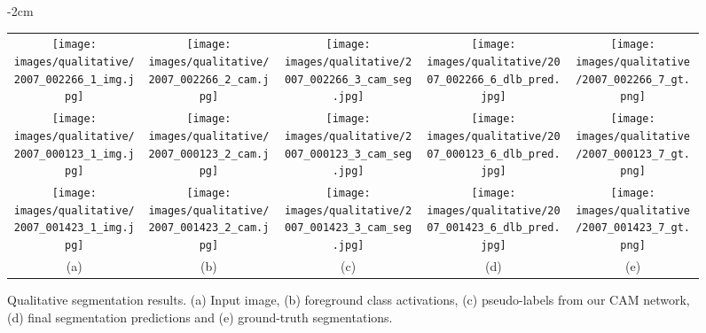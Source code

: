 \documentclass{article}
\begin{document}
\begin{figure}[p]
	\setlength\abovecaptionskip{-8pt}
	\begin{center}
	\addtolength{\leftskip} {-2cm}
    \addtolength{\rightskip}{-2cm}
	\begin{tabular}{c>{\hspace{-10pt}}c>{\hspace{-10pt}}c>{\hspace{-10pt}}c>{\hspace{-10pt}}c}
		\texttt{[image: images/qualitative/2007\_002266\_1\_img.jpg]} &
		\texttt{[image: images/qualitative/2007\_002266\_2\_cam.jpg]} &
		\texttt{[image: images/qualitative/2007\_002266\_3\_cam\_seg.jpg]} &
		\texttt{[image: images/qualitative/2007\_002266\_6\_dlb\_pred.jpg]} &
		\texttt{[image: images/qualitative/2007\_002266\_7\_gt.png]} \\[-1pt]
		\texttt{[image: images/qualitative/2007\_000123\_1\_img.jpg]} &
		\texttt{[image: images/qualitative/2007\_000123\_2\_cam.jpg]} &
		\texttt{[image: images/qualitative/2007\_000123\_3\_cam\_seg.jpg]} &
		\texttt{[image: images/qualitative/2007\_000123\_6\_dlb\_pred.jpg]} &
		\texttt{[image: images/qualitative/2007\_000123\_7\_gt.png]} \\[-1pt]
		\texttt{[image: images/qualitative/2007\_001423\_1\_img.jpg]} &
		\texttt{[image: images/qualitative/2007\_001423\_2\_cam.jpg]} &
		\texttt{[image: images/qualitative/2007\_001423\_3\_cam\_seg.jpg]} &
		\texttt{[image: images/qualitative/2007\_001423\_6\_dlb\_pred.jpg]} &
		\texttt{[image: images/qualitative/2007\_001423\_7\_gt.png]} \\[-1pt]
		(a) & (b) & (c) & (d) & (e)
	\end{tabular}
	\end{center}
	\caption{Qualitative segmentation results. (a) Input image, (b) foreground class activations, (c) pseudo-labels from our CAM network, (d) final segmentation predictions and (e) ground-truth segmentations.}
	\label{fig_qualitative_results}
\end{figure}
\end{document}
